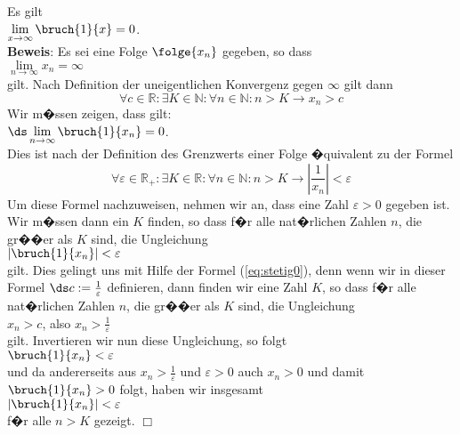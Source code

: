 \example 
Es gilt
\\[0.2cm]
\hspace*{1.3cm}      
$\lim\limits_{x\rightarrow\infty} \bruch{1}{x} = 0$.
\\[0.2cm]
\textbf{Beweis}:  Es sei eine Folge $\folge{x_n}$ gegeben, so dass 
\\[0.2cm]
\hspace*{1.3cm}      
$\lim\limits_{n\rightarrow\infty} x_n = \infty$
\\[0.2cm]
gilt.   Nach Definition der uneigentlichen Konvergenz gegen $\infty$ gilt dann
\begin{equation}
  \label{eq:stetig0}  
  \forall c \in \mathbb{R}: \exists K \in \mathbb{N}: \forall n \in \mathbb{N}: n > K \rightarrow x_n > c
\end{equation}
Wir m�ssen zeigen, dass gilt:
\\[0.2cm]
\hspace*{1.3cm}
$\ds \lim\limits_{n\rightarrow\infty} \bruch{1}{x_n} = 0$.
\\[0.2cm]
Dies ist nach der Definition des Grenzwerts einer Folge �quivalent zu der Formel
\begin{equation}
  \label{eq:stetig1}
  \forall \varepsilon \in\mathbb{R}_+: \exists K \in \mathbb{R} : \forall n \in \mathbb{N}
  : n > K \rightarrow \left|\frac{1}{x_n}\right| < \varepsilon
\end{equation}
Um diese Formel nachzuweisen, nehmen wir an, dass eine Zahl $\varepsilon>0$
gegeben ist.  Wir m�ssen dann ein $K$ finden, so dass f�r alle nat�rlichen Zahlen $n$, die
gr��er als $K$ sind, die Ungleichung 
\\[0.2cm]
\hspace*{1.3cm} $\left|\bruch{1}{x_n}\right| < \varepsilon$
\\[0.2cm]
gilt.  Dies gelingt uns mit Hilfe der Formel (\ref{eq:stetig0}), denn wenn wir in dieser Formel
$\ds c := \frac{1}{\varepsilon}$ definieren, dann finden wir eine Zahl $K$, so dass f�r alle
nat�rlichen Zahlen $n$, die
gr��er als $K$ sind, die Ungleichung  
\\[0.2cm] \hspace*{1.3cm} $\displaystyle x_n > c$, \quad also $\displaystyle x_n > \frac{1}{\varepsilon}$ \\[0.2cm]
gilt.  Invertieren wir nun diese Ungleichung, so folgt
\\[0.2cm]
\hspace*{1.3cm}
$\bruch{1}{x_n} < \varepsilon$
\\[0.2cm]
und da andererseits aus $x_n > \frac{1}{\varepsilon}$ und $\varepsilon > 0$ auch $x_n > 0$
und damit $\bruch{1}{x_n} > 0$ folgt, haben wir insgesamt 
\\[0.2cm]
\hspace*{1.3cm}
$\left|\bruch{1}{x_n}\right| < \varepsilon$
\\[0.2cm]
f�r alle $n > K$ gezeigt. \hspace*{\fill} $\Box$
\vspace*{0.3cm}

